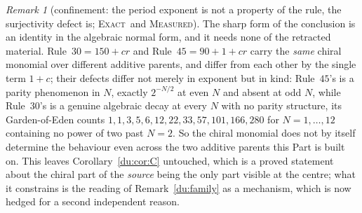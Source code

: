 \documentclass[11pt]{article}
\theoremstyle{definition}
\theoremstyle{remark}
\newtheorem{remark}[theorem]{Remark}
\newcommand{\EXACT}{\textsc{Exact}}
\newcommand{\MEASURED}{\textsc{Measured}}
\begin{document}
\begin{remark}[confinement: the period exponent is not a property of the rule, the surjectivity defect is; \EXACT\ and \MEASURED]
The sharp form of the conclusion is an identity in the algebraic normal form, and it needs none of the
retracted material. Rule~$30=150+cr$ and Rule~$45=90+1+cr$ carry the \emph{same} chiral monomial over
different additive parents, and differ from each other by the single term $1+c$; their defects differ
not merely in exponent but in kind: Rule~$45$'s is a parity phenomenon in $N$, exactly $2^{-N/2}$ at
even $N$ and absent at odd $N$, while Rule~$30$'s is a genuine algebraic decay at every $N$ with no parity
structure, its Garden-of-Eden counts $1,1,3,5,6,12,22,33,57,101,166,280$ for $N=1,\dots,12$ containing no
power of two past $N=2$. So the chiral monomial does not by itself determine the behaviour even across
the two additive parents this Part is built on. This leaves Corollary~\ref{du:cor:C} untouched,
which is a proved statement about the chiral part of the \emph{source} being the only part visible at
the centre; what it constrains is the reading of Remark~\ref{du:family} as a mechanism, which is now
hedged for a second independent reason.
\end{remark}
\end{document}
